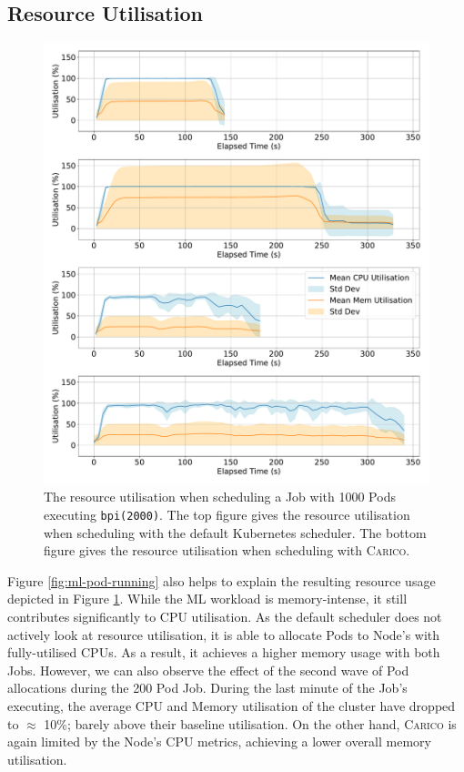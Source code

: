 \subsection{Resource Utilisation}
\begin{figure}[ht!]
    \centering
    \includegraphics[width=\textwidth]{images/ml-util.pdf}
    \caption{The resource utilisation when scheduling a Job with 1000 Pods
    executing \texttt{bpi(2000)}. The top figure gives the resource utilisation
    when scheduling with the default Kubernetes scheduler. The bottom figure
    gives the resource utilisation when scheduling with \textsc{Carico}.}
    \label{fig:ml-util}
\end{figure}

Figure \ref{fig:ml-pod-running} also helps to explain the resulting resource usage
depicted in Figure \ref{fig:ml-util}. While the ML workload is memory-intense,
it still contributes significantly to CPU utilisation. As the default scheduler
does not actively look at resource utilisation, it is able to allocate Pods to
Node's with fully-utilised CPUs. As a result, it achieves a higher memory usage
with both Jobs. However, we can also observe the effect of the second wave of
Pod allocations during the 200 Pod Job. During the last minute of the Job's
executing, the average CPU and Memory utilisation of the cluster have dropped to
$\approx$ 10\%; barely above their baseline utilisation.
On the other hand, \textsc{Carico} is again limited by the Node's CPU metrics, achieving
a lower overall memory utilisation.


